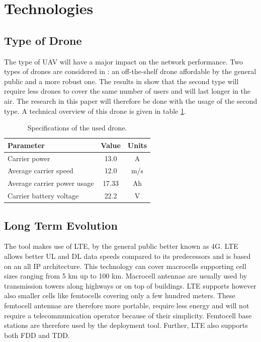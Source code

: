 \section{Technologies}
\subsection{Type of Drone}
\label{sec:typeofdrone}

The type of \gls{UAV} will have a major impact on the network performance.
Two types of 
drones are considered in \cite{J2}: an off-the-shelf drone affordable by the general public and a more robust one. The results in \cite{J2}
show that the second type will require less drones to cover the same number of users and will last longer in the air. The research in this paper
will therefore be done with the usage of the second type. A technical overview of this drone is given in table \ref{table:dronespecs}.

\begin{table}[h!]
\centering
\begin{tabular}{|l|c|c|}
\hline
 Parameter          & Value      & Units   \\    \hline
 Carrier power      & 13.0 &A \\
 Average carrier speed           & 12.0 &m/s       \\ 
 Average carrier power usage    & 17.33& Ah      \\ 
 Carrier battery voltage        & 22.2 &V \\ \hline
\end{tabular}
\caption{Specifications of the used drone.}
\label{table:dronespecs}
\end{table}

\subsection{Long Term Evolution}
The tool makes use of \gls{LTE}, by the general public better known as 4G.  \gls{LTE} allows better \gls{UL} and \gls{DL} data speeds 
compared to its predecessors and is based on an all IP architecture. This technology can cover macrocells supporting cell sizes ranging from 5 km up to 100 km. 
Macrocell antennae are usually used by transmission towers along highways or on top of buildings. LTE supports however also smaller cells like
femtocells covering only a few hundred meters. These femtocell antennae are therefore more portable, require less energy and will not require a telecommunication operator because
of their simplicity. Femtocell base stations are therefore used by the deployment tool.
Further, \gls{LTE} also supports both \gls{FDD} and \gls{TDD}.

